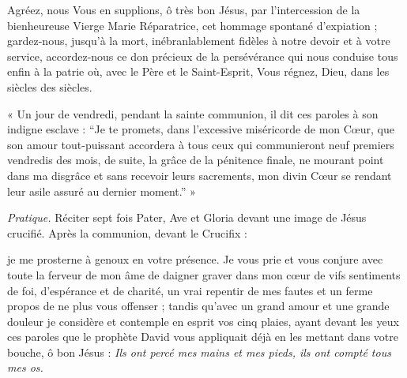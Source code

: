 \documentclass{bibliotheca-missel}
\begin{document}
Agréez, nous Vous en supplions, ô très bon Jésus, par l’intercession de la bienheureuse Vierge Marie Réparatrice, cet hommage spontané d’expiation ; gardez-nous, jusqu’à la mort, inébranlablement fidèles à notre devoir et à votre service, accordez-nous ce don précieux de la persévérance qui nous conduise tous enfin à la patrie où, avec le Père et le Saint-Esprit, Vous régnez, Dieu, dans les siècles des siècles.
\begin{notice}
« Un jour de vendredi, pendant la sainte communion, il dit ces paroles à son indigne esclave : “Je te promets, dans l’excessive miséricorde de mon Cœur, que son amour tout-puissant accordera à tous ceux qui communieront neuf premiers vendredis des mois, de suite, la grâce de la pénitence finale, ne mourant point dans ma disgrâce et sans recevoir leurs sacrements, mon divin Cœur se rendant leur asile assuré au dernier moment.” »
\end{notice}

\begin{notice}\textit{Pratique.} Réciter sept fois Pater, Ave et Gloria devant une image de Jésus crucifié. Après la communion, devant le Crucifix :\end{notice}
 je me prosterne à genoux en votre présence. Je vous prie et vous conjure avec toute la ferveur de mon âme de daigner graver dans mon cœur de vifs sentiments de foi, d’espérance et de charité, un vrai repentir de mes fautes et un ferme propos de ne plus vous offenser ; tandis qu’avec un grand amour et une grande douleur je considère et contemple en esprit vos cinq plaies, ayant devant les yeux ces paroles que le prophète David vous appliquait déjà en les mettant dans votre bouche, ô bon Jésus : \textit{Ils ont percé mes mains et mes pieds, ils ont compté tous mes os.}
\end{document}
